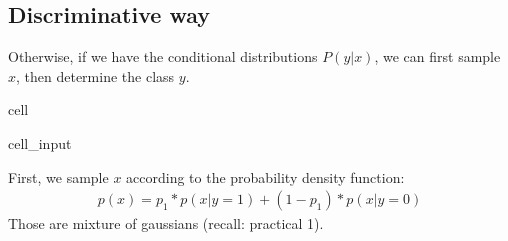 \documentclass[letterpaper,10pt,english]{jupyterBook}
\begin{document}
\subsection{Discriminative way}
\label{\detokenize{06:discriminative-way}}
\sphinxAtStartPar
Otherwise, if we have the conditional distributions \(P(y|x)\), we can first sample \(x\), then determine the class \(y\).

\begin{sphinxuseclass}{cell}\begin{sphinxVerbatimInput}

\begin{sphinxuseclass}{cell_input}
\begin{sphinxVerbatim}[commandchars=\\\{\}]
 
\end{sphinxVerbatim}

\end{sphinxuseclass}\end{sphinxVerbatimInput}

\end{sphinxuseclass}
\sphinxAtStartPar
First, we sample \(x\) according to the probability density function:
\begin{equation*}
\begin{split}p(x)= p_1*p(x|y=1) + (1-p_1)*p(x|y=0)\end{split}
\end{equation*}
\sphinxAtStartPar
Those are mixture of gaussians (recall: practical 1).
\end{document}
